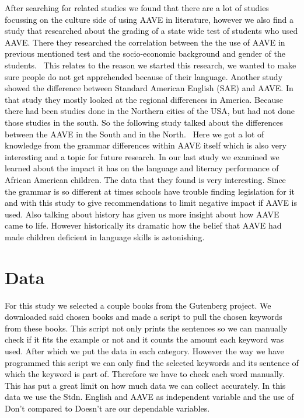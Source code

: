 \documentclass[11pt]{article}
\begin{document}
\textcolor{black}{After searching for related studies we found that there are a lot of studies focussing on the culture side of using AAVE in literature, however we also find a study that researched about the grading of a state wide test of students who used AAVE. There they researched the correlation between the the use of AAVE in previous mentioned test and the socio-economic background and gender of the students.~\citep{Nesbitt2022} This relates to the reason we started this research, we wanted to make sure people do not get apprehended because of their language. Another study showed the difference between Standard American English (SAE) and AAVE. In that study they mostly looked at the regional differences in America. Because there had been studies done in the Northern cities of the USA, but had not done those studies in the south. So the following study talked about the differences between the AAVE in the South and in the North.~\citep{Wolfram200} Here we got a lot of knowledge from the grammar differences within AAVE itself which is also very interesting and a topic for future research. In our last study we examined we learned about the impact it has on the language and literacy performance of African American children. The data that they found is very interesting. Since the grammar is so different at times schools have trouble finding legislation for it and with this study to give recommendations to limit negative impact if AAVE is used. Also talking about history has given us more insight about how AAVE came to life. However historically its dramatic how the belief that AAVE had made children deficient in language skills is astonishing.~\citep{Harris2024}}

\section{Data}

\textcolor{black}{For this study we selected a couple books from the Gutenberg project. We downloaded said chosen books and made a script to pull the chosen keywords from these books. This script not only prints the sentences so we can manually check if it fits the example or not and it counts the amount each keyword was used. After which we put the data in each category. However the way we have programmed this script we can only find the selected keywords and its sentence of which the keyword is part of. Therefore we have to check each word manually. This has put a great limit on how much data we can collect accurately. In this data we use the Stdn. English and AAVE as independent variable and the use of Don't compared to Doesn't are our dependable variables.}
\end{document}
